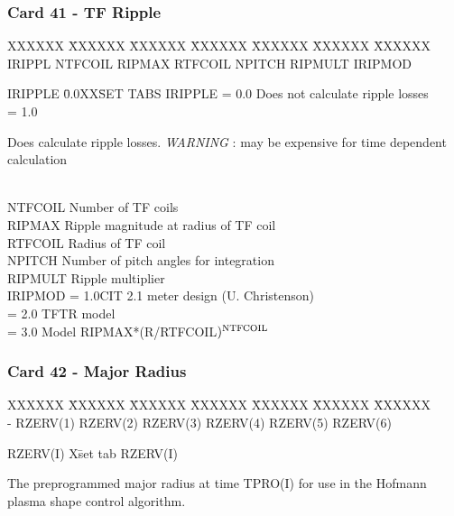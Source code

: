 \subsubsection{Card 41 - TF Ripple}
\begin{tabbing}
XXXXXX \= XXXXXX \= XXXXXX \= XXXXXX \= XXXXXX \= XXXXXX \= XXXXXX
      \\
\footnotesize  IRIPPL \>\footnotesize NTFCOIL \>\footnotesize RIPMAX \>\footnotesize
RTFCOIL \>\footnotesize NPITCH \>\footnotesize RIPMULT \>\footnotesize IRIPMOD \\
\end{tabbing}
\begin{tabbing}
IRIPPLE \= 0.0XX\= SET TABS \kill
IRIPPLE \> = 0.0 \>Does not calculate ripple losses\\
        \> = 1.0 \> \parbox[t]{\width}{Does calculate ripple losses. {\em WARNING} : may be
expensive for time dependent calculation}\\
NTFCOIL \> \> Number of TF coils\\
RIPMAX  \> \> Ripple magnitude at radius of TF coil\\
RTFCOIL \> \> Radius of TF coil\\
NPITCH \> \>Number of pitch angles for integration\\
RIPMULT \> \>Ripple multiplier\\ 
IRIPMOD \>= 1.0\>CIT 2.1 meter design (U. Christenson)\\
        \>= 2.0\> TFTR model\\
        \>= 3.0\> Model RIPMAX*(R/RTFCOIL$)^{\rm NTFCOIL}$
\end{tabbing}
\newpage \subsubsection{Card 42 - Major Radius}
\begin{tabbing}
XXXXXX \= XXXXXX \= XXXXXX \= XXXXXX \= XXXXXX \= XXXXXX \=
XXXXXX       \\
\footnotesize - \>\footnotesize  RZERV(1) \>\footnotesize RZERV(2) \>\footnotesize RZERV(3)
\>\footnotesize RZERV(4) \>\footnotesize RZERV(5) \>\footnotesize RZERV(6) \\
\end{tabbing}
\begin{tabbing}
RZERV(I) X\= set tab \kill
RZERV(I) \> \parbox[t]{\width}{The preprogrammed major radius at time TPRO(I)
for use in the Hofmann plasma shape control algorithm.}\\
\end{tabbing}
